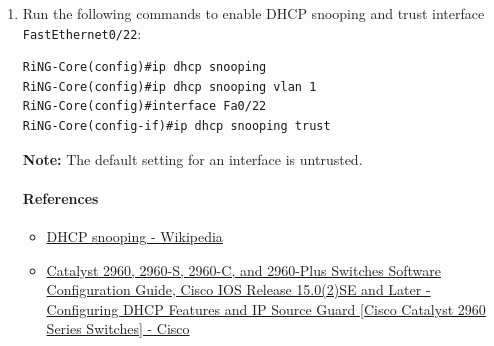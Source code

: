 \documentclass[12pt, a4paper]{article}
\begin{document}
\begin{enumerate}
    \item Run the following commands to enable DHCP snooping and trust interface\\
    \verb|FastEthernet0/22|:
\begin{verbatim}
RiNG-Core(config)#ip dhcp snooping
RiNG-Core(config)#ip dhcp snooping vlan 1
RiNG-Core(config)#interface Fa0/22
RiNG-Core(config-if)#ip dhcp snooping trust
\end{verbatim}
    \textbf{Note:} The default setting for an interface is untrusted.

    \paragraph{References}
    \begin{itemize}
      \item \href{https://en.wikipedia.org/wiki/DHCP_snooping}{DHCP snooping - Wikipedia}
      \item \href{https://www.cisco.com/c/en/us/td/docs/switches/lan/catalyst2960/software/release/15-0_2_se/configuration/guide/scg2960/swdhcp82.html}{Catalyst 2960, 2960-S, 2960-C, and 2960-Plus Switches Software Configuration Guide, Cisco IOS Release 15.0(2)SE and Later - Configuring DHCP Features and IP Source Guard [Cisco Catalyst 2960 Series Switches] - Cisco}
    \end{itemize}
  \end{enumerate}
\end{document}
